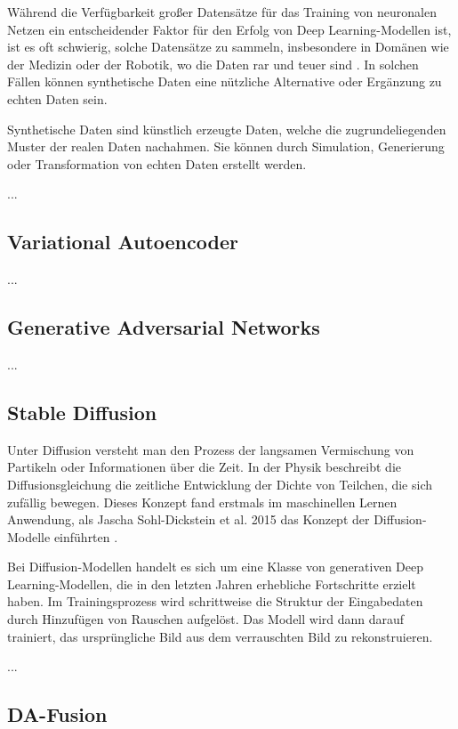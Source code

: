 Während die Verfügbarkeit großer Datensätze für das Training von neuronalen Netzen ein entscheidender Faktor für den Erfolg von Deep Learning-Modellen ist, ist es oft schwierig, solche Datensätze zu sammeln, insbesondere in Domänen wie der Medizin oder der Robotik, wo die Daten rar und teuer sind \cite{}. In solchen Fällen können synthetische Daten eine nützliche Alternative oder Ergänzung zu echten Daten sein.

Synthetische Daten sind künstlich erzeugte Daten, welche die zugrundeliegenden Muster der realen Daten nachahmen. Sie können durch Simulation, Generierung oder Transformation von echten Daten erstellt werden.

...

\subsection{Variational Autoencoder}

...

\subsection{Generative Adversarial Networks}

...

\subsection{Stable Diffusion}

Unter Diffusion versteht man den Prozess der langsamen Vermischung von Partikeln oder Informationen über die Zeit. In der Physik beschreibt die Diffusionsgleichung die zeitliche Entwicklung der Dichte von Teilchen, die sich zufällig bewegen. Dieses Konzept fand erstmals im maschinellen Lernen Anwendung, als Jascha Sohl-Dickstein et al. 2015 das Konzept der Diffusion-Modelle einführten \parencite{}.

Bei Diffusion-Modellen handelt es sich um eine Klasse von generativen Deep Learning-Modellen, die in den letzten Jahren erhebliche Fortschritte erzielt haben. Im Trainingsprozess wird schrittweise die Struktur der Eingabedaten durch Hinzufügen von Rauschen aufgelöst. Das Modell wird dann darauf trainiert, das ursprüngliche Bild aus dem verrauschten Bild zu rekonstruieren.

...

\subsection{DA-Fusion}

